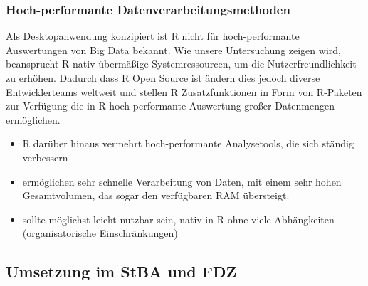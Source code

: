 \documentclass[
  german,
  10pt,
  twoside]{article}
\providecommand{\tightlist}{%
  \setlength{\itemsep}{0pt}\setlength{\parskip}{0pt}}
\begin{document}
\subsubsection{Hoch-performante
Datenverarbeitungsmethoden}\label{hoch-performante-datenverarbeitungsmethoden}

Als Desktopanwendung konzipiert ist R nicht für hoch-performante
Auswertungen von Big Data bekannt. Wie unsere Untersuchung zeigen wird,
beansprucht R nativ übermäßige Systemressourcen, um die
Nutzerfreundlichkeit zu erhöhen. Dadurch dass R Open Source ist ändern
dies jedoch diverse Entwicklerteams weltweit und stellen R
Zusatzfunktionen in Form von R-Paketen zur Verfügung die in R
hoch-performante Auswertung großer Datenmengen ermöglichen.

\begin{itemize}
\tightlist
\item
  R darüber hinaus vermehrt hoch-performante Analysetools, die sich
  ständig verbessern
\item
  ermöglichen sehr schnelle Verarbeitung von Daten, mit einem sehr hohen
  Gesamtvolumen, das sogar den verfügbaren RAM übersteigt.
\item
  sollte möglichst leicht nutzbar sein, nativ in R ohne viele
  Abhängkeiten (organisatorische Einschränkungen)
\end{itemize}

\subsection{Umsetzung im StBA und FDZ}\label{umsetzung-im-stba-und-fdz}
\end{document}
